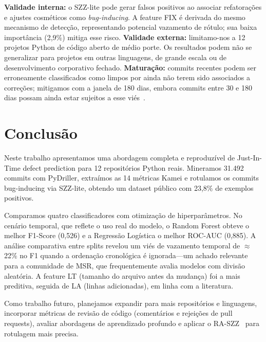 \documentclass[12pt]{article}
\begin{document}
\textbf{Validade interna:} o SZZ-lite pode gerar falsos positivos ao associar
refatorações e ajustes cosméticos como \textit{bug-inducing}. A feature FIX é
derivada do mesmo mecanismo de detecção, representando potencial vazamento de
rótulo; sua baixa importância (2,9\%) mitiga esse risco.
\textbf{Validade externa:} limitamo-nos a 12 projetos Python de código aberto de
médio porte. Os resultados podem não se generalizar para projetos em outras linguagens,
de grande escala ou de desenvolvimento corporativo fechado.
\textbf{Maturação:} commits recentes podem ser erroneamente classificados como limpos
por ainda não terem sido associados a correções; mitigamos com a janela de 180 dias,
embora commits entre 30 e 180 dias possam ainda estar sujeitos a esse viés~\cite{dacosta2017}.

\section{Conclusão}
\label{sec:conclusao}

Neste trabalho apresentamos uma abordagem completa e reproduzível de Just-In-Time
defect prediction para 12 repositórios Python reais. Mineramos 31.492 commits com
PyDriller, extraímos as 14 métricas Kamei e rotulamos os commits bug-inducing via
SZZ-lite, obtendo um dataset público com 23,8\% de exemplos positivos.

Comparamos quatro classificadores com otimização de hiperparâmetros. No cenário
temporal, que reflete o uso real do modelo, o Random Forest obteve o melhor
F1-Score (0,526) e a Regressão Logística o melhor ROC-AUC (0,885).
A análise comparativa entre splits revelou um viés de vazamento temporal de
$\approx$22\% no F1 quando a ordenação cronológica é ignorada---um achado relevante
para a comunidade de MSR, que frequentemente avalia modelos com divisão aleatória.
A feature LT (tamanho do arquivo antes da mudança) foi a mais preditiva,
seguida de LA (linhas adicionadas), em linha com a literatura.

Como trabalho futuro, planejamos expandir para mais repositórios e linguagens,
incorporar métricas de revisão de código (comentários e rejeições de pull requests),
avaliar abordagens de aprendizado profundo e aplicar o RA-SZZ~\cite{dacosta2017}
para rotulagem mais precisa.



\end{document}
